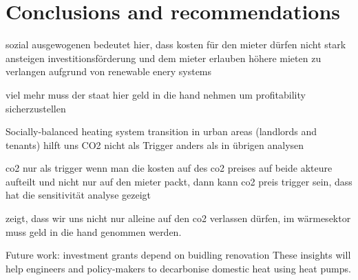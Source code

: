 \section{Conclusions and recommendations}\label{conclusions}


sozial ausgewogenen bedeutet hier, dass kosten für den mieter dürfen nicht stark ansteigen 
investitionsförderung und dem mieter erlauben höhere mieten zu verlangen aufgrund von renewable enery systems


viel mehr muss der staat hier geld in die hand nehmen um profitability sicherzustellen 

Socially-balanced heating system transition in urban areas (landlords and tenants) hilft uns CO2 nicht als Trigger anders als in übrigen analysen

co2 nur als trigger wenn man die kosten auf des co2 preises auf beide akteure aufteilt und nicht nur auf den mieter packt, dann kann co2 preis trigger sein, dass hat die sensitivität analyse gezeigt

zeigt, dass wir uns nicht nur alleine auf den co2 verlassen dürfen, im wärmesektor muss geld in die hand genommen werden. 


Future work: investment grants depend on buidling renovation
These insights will help engineers and policy-makers to decarbonise domestic heat using heat pumps.